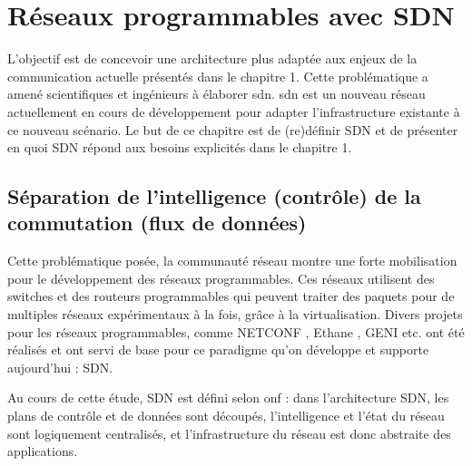 \chapter{Réseaux programmables avec SDN}

L'objectif est de concevoir une architecture plus adaptée aux enjeux de la communication actuelle présentés dans le chapitre 1. Cette problématique a amené scientifiques et ingénieurs à élaborer \gls{sdn}. \gls{sdn} est un nouveau  réseau actuellement en cours de développement pour adapter l'infrastructure existante à ce nouveau scénario.
Le but de ce chapitre est de (re)définir SDN et de présenter en quoi SDN répond aux besoins explicités dans le chapitre 1.


\section{Séparation de l'intelligence (contrôle) de la commutation (flux de données)}

Cette problématique posée, la communauté réseau montre une forte mobilisation pour le développement des réseaux programmables. Ces réseaux utilisent des switches et des routeurs programmables qui peuvent traiter des paquets pour de multiples réseaux expérimentaux  à la fois, grâce à la \gls{virtualisation}. \cite{OpenFlowStanfordOssification} Divers projets pour les réseaux programmables, comme NETCONF \cite{NETCONF}, Ethane \cite{Ethane}, GENI \cite{GENI} etc. ont été réalisés et ont servi de base pour ce paradigme qu'on développe et supporte aujourd'hui : SDN. 


Au cours de cette étude, SDN est défini selon \gls{onf} : dans l'architecture SDN, les plans de contrôle et de données sont découpés, l'intelligence et l'état du réseau sont logiquement centralisés, et l'infrastructure du réseau est donc abstraite des applications. \cite{SDNNewNormONFExecutiveSummary}


